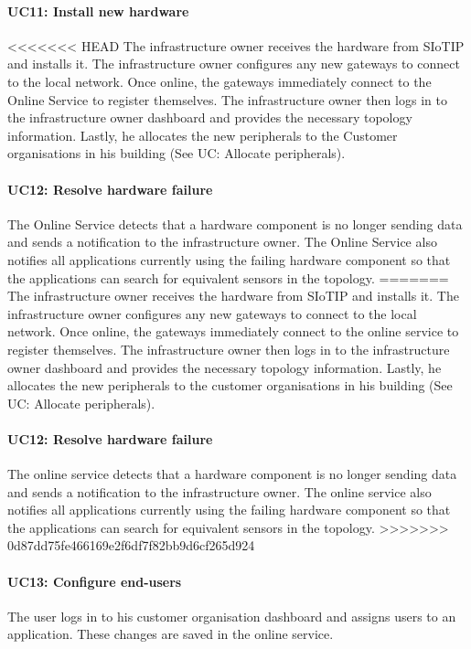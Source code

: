 \documentclass[english]{sareport}
\begin{document}
\paragraph{UC11: Install new hardware}
<<<<<<< HEAD
The infrastructure owner receives the hardware from SIoTIP and installs it. The infrastructure owner configures any new gateways to connect to the local network. Once online, the gateways immediately connect to the Online Service to register themselves. The infrastructure owner then logs in to the infrastructure owner dashboard and provides the necessary topology information. Lastly, he allocates the new peripherals to the Customer organisations in his building (See UC: Allocate peripherals).

\paragraph{UC12: Resolve hardware failure}
The Online Service detects that a hardware component is no longer sending data and sends a notification to the infrastructure owner. The Online Service also notifies all applications currently using the failing hardware component so that the applications can search for equivalent sensors in the topology. 
=======
The infrastructure owner receives the hardware from SIoTIP and installs it. The infrastructure owner configures any new gateways to connect to the local network. Once online, the gateways immediately connect to the online service to register themselves. The infrastructure owner then logs in to the infrastructure owner dashboard and provides the necessary topology information. Lastly, he allocates the new peripherals to the customer organisations in his building (See UC: Allocate peripherals).

\paragraph{UC12: Resolve hardware failure}
The online service detects that a hardware component is no longer sending data and sends a notification to the infrastructure owner. The online service also notifies all applications currently using the failing hardware component so that the applications can search for equivalent sensors in the topology. 
>>>>>>> 0d87dd75fe466169e2f6df7f82bb9d6cf265d924

\paragraph{UC13: Configure end-users}
The user logs in to his customer organisation dashboard and assigns users to an application. These changes are saved in the online service.
\end{document}

